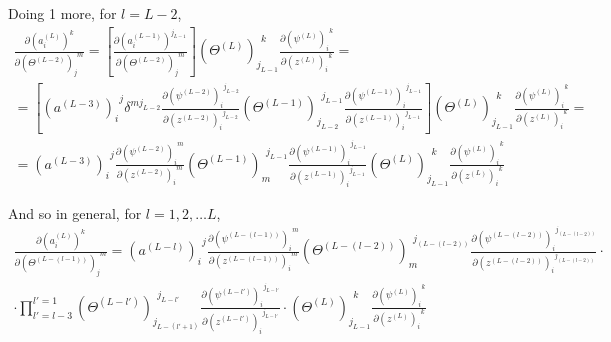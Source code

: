 \documentclass[10pt]{amsart}
\begin{document}
\begin{multicols*}{2}
Doing 1 more, for $l=L-2$, 
\[
\begin{gathered}
\frac{\partial (a_i^{(L)})^k }{ \partial (\Theta^{(L-2)})_j^{\  \  m} } =  \left[  \frac{\partial (a_i^{(L-1)})^{j_{L-1} }}{ \partial (\Theta^{(L-2)})_j^{\  \  m} } \right]  (\Theta^{(L)})_{ j_{L-1}}^{\  \  k}      \frac{ \partial (\psi^{(L)})_i^{\  \  k } }{ \partial (z^{(L)})_i^{\  \  k} } = \\
= \left[ (a^{(L-3)})_i^{\  \  j} \delta^{m j_{L-2}}  \frac{ \partial (\psi^{(L-2)})_i^{\  \  j_{L-2} } }{ \partial (z^{(L-2)})_i^{\  \  j_{L-2}} }  (\Theta^{(L-1)})_{ j_{L-2}}^{\  \  j_{L-1}}    \frac{ \partial (\psi^{(L-1)})_i^{\  \  j_{L-1} } }{ \partial (z^{(L-1)})_i^{\  \  j_{L-1}} } \right]  (\Theta^{(L)})_{ j_{L-1}}^{\  \  k}      \frac{ \partial (\psi^{(L)})_i^{\  \  k } }{ \partial (z^{(L)})_i^{\  \  k} } = \\
=  (a^{(L-3)})_i^{\  \  j}    \frac{ \partial (\psi^{(L-2)})_i^{\  \  m } }{ \partial (z^{(L-2)})_i^{\  \   m } }  (\Theta^{(L-1)})_{ m }^{\  \  j_{L-1}}    \frac{ \partial (\psi^{(L-1)})_i^{\  \  j_{L-1} } }{ \partial (z^{(L-1)})_i^{\  \  j_{L-1}} }   (\Theta^{(L)})_{ j_{L-1}}^{\  \  k}      \frac{ \partial (\psi^{(L)})_i^{\  \  k } }{ \partial (z^{(L)})_i^{\  \  k} }
\end{gathered}
\]

And so in general, for $l=1,2,\dots L$, 
\begin{equation}
\boxed{ \begin{gathered}
\frac{\partial (a_i^{(L)})^k }{ \partial (\Theta^{(L-(l-1))})_j^{\  \  m} } =   (a^{(L-l)})_i^{\  \  j}    \frac{ \partial (\psi^{(L-(l-1))})_i^{\  \  m } }{ \partial (z^{(L-(l-1))})_i^{\  \   m } }  (\Theta^{(L-(l-2))})_m^{\  \  j_{(L-(l-2))}}      \frac{ \partial (\psi^{(L-(l-2))})_i^{\  \  j_{(L-(l-2))} } }{ \partial (z^{(L-(l-2))})_i^{\  \  j_{(L-(l-2))}} } \cdot \\
\cdot \prod_{l' = l-3}^{l'=1} (\Theta^{(L-l')})_{ j_{L-(l'+1)}}^{\  \  j_{L-l'}}      \frac{ \partial (\psi^{(L-l')})_i^{\  \  j_{L-l'} } }{ \partial (z^{(L-l')})_i^{\  \  j_{L-l'}} } \cdot (\Theta^{(L)})_{ j_{L-1}}^{\  \  k}      \frac{ \partial (\psi^{(L)})_i^{\  \  k } }{ \partial (z^{(L)})_i^{\  \  k} }
\end{gathered} 
}
\end{equation}


\end{multicols*}
\end{document}
